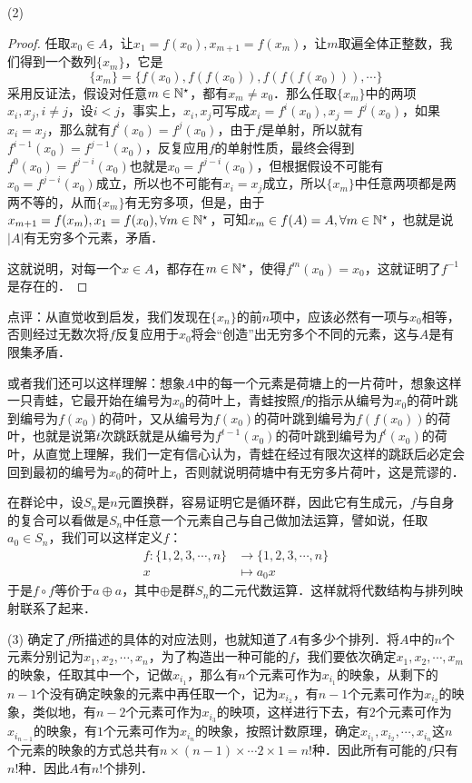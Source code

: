 (2)
\begin{proof}
任取$x_0 \in A$，让$x_{1} = f(x_0), x_{m+1} = f(x_m)$，让$m$取遍全体正整数，我们得到一个数列$\{ x_m \}$，它是
\begin{equation}
    \{ x_m \} = \{ f(x_0), f(f(x_0)), f(f(f(x_0))), \cdots \}
\end{equation}
采用反证法，假设对任意$m \in \mathbb{N}^\star$，都有$x_m \neq x_0$．那么任取$\{ x_m \}$中的两项$x_i, x_j, i \neq j$，设$ i < j$，事实上，$x_i, x_j$可写成$x_i = f^{i}(x_0), x_j = f^j (x_0)$，如果$x_i = x_j$，那么就有$f^{i}(x_0) = f^{j}(x_0)$，由于$f$是单射，所以就有$f^{i-1}(x_0) = f^{j-1}(x_0)$，反复应用$f$的单射性质，最终会得到$f^{0}(x_0) = f^{j-i}(x_0)$也就是$x_0 = f^{j-i}(x_0)$，但根据假设不可能有$x_0 = f^{j-i}(x_0)$成立，所以也不可能有$x_i = x_j$成立，所以$\{ x_m \}$中任意两项都是两两不等的，从而$\{ x_m \}$有无穷多项，但是，由于$x_{m+1} = f(x_m), x_1 = f(x_0), \forall m \in \mathbb{N}^\star$，可知$x_m \in f(A) = A, \forall m \in \mathbb{N}^\star$，也就是说$|A|$有无穷多个元素，矛盾．

这就说明，对每一个$x \in A$，都存在$m \in \mathbb{N}^\star$，使得$f^m (x_0) = x_0$，这就证明了$f^{-1}$是存在的．
\end{proof}

点评：从直觉收到启发，我们发现在$\{ x_n \}$的前$n$项中，应该必然有一项与$x_0$相等，否则经过无数次将$f$反复应用于$x_0$将会``创造''出无穷多个不同的元素，这与$A$是有限集矛盾．

或者我们还可以这样理解：想象$A$中的每一个元素是荷塘上的一片荷叶，想象这样一只青蛙，它最开始在编号为$x_0$的荷叶上，青蛙按照$f$的指示从编号为$x_0$的荷叶跳到编号为$f(x_0)$的荷叶，又从编号为$f(x_0)$的荷叶跳到编号为$f(f(x_0))$的荷叶，也就是说第$t$次跳跃就是从编号为$f^{t-1}(x_0)$的荷叶跳到编号为$f^{t}(x_0)$的荷叶，从直觉上理解，我们一定有信心认为，青蛙在经过有限次这样的跳跃后必定会回到最初的编号为$x_0$的荷叶上，否则就说明荷塘中有无穷多片荷叶，这是荒谬的．

在群论中，设$S_n$是$n$元置换群，容易证明它是循环群，因此它有生成元，$f$与自身的复合可以看做是$S_n$中任意一个元素自己与自己做加法运算，譬如说，任取$a_0 \in S_n$，我们可以这样定义$f$：
\begin{align}
    f: \{1,2,3,\cdots,n\} &\to \{ 1,2,3,\cdots, n\} \\
    x &\mapsto a_0 x
\end{align}
于是$f \circ f$等价于$a \oplus a$，其中$\oplus$是群$S_n$的二元代数运算．这样就将代数结构与排列映射联系了起来．

(3) 确定了$f$所描述的具体的对应法则，也就知道了$A$有多少个排列．将$A$中的$n$个元素分别记为$x_1, x_2, \cdots, x_n$，为了构造出一种可能的$f$，我们要依次确定$x_1, x_2, \cdots, x_m$的映象，任取其中一个，记做$x_{i_1}$，那么有$n$个元素可作为$x_{i_1}$的映象，从剩下的$n-1$个没有确定映象的元素中再任取一个，记为$x_{i_2}$，有$n-1$个元素可作为$x_{i_2}$的映象，类似地，有$n-2$个元素可作为$x_{i_3}$的映项，这样进行下去，有$2$个元素可作为$x_{i_{n-1}}$的映象，有$1$个元素可作为$x_{i_n}$的映象，按照计数原理，确定$x_{i_1}, x_{i_2}, \cdots, x_{i_n}$这$n$个元素的映象的方式总共有$n \times (n-1) \times \cdots 2 \times 1 = n!$种．因此所有可能的$f$只有$n!$种．因此$A$有$n!$个排列．

